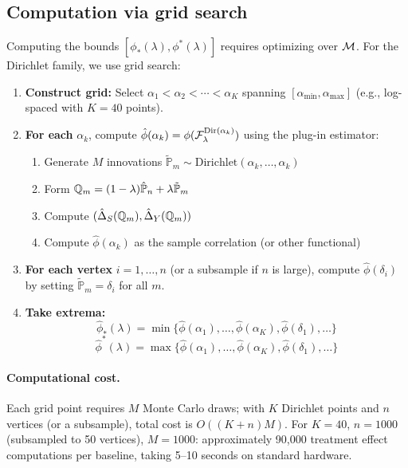 \documentclass{article}
\newcommand{\PP}{\mathbb{P}}
\begin{document}
\subsection{Computation via grid search}

Computing the bounds $[\phi_*(\lambda), \phi^*(\lambda)]$ requires optimizing over $\mathcal{M}$. For the Dirichlet family, we use grid search:

\begin{enumerate}
    \item \textbf{Construct grid:} Select $\alpha_1 < \alpha_2 < \cdots < \alpha_K$ spanning $[\alpha_{\min}, \alpha_{\max}]$ (e.g., log-spaced with $K = 40$ points).

    \item \textbf{For each} $\alpha_k$, compute $\hat{\phi}(\alpha_k) = \phi(\mathcal{F}_\lambda^{\text{Dir}(\alpha_k)})$ using the plug-in estimator:
          \begin{enumerate}
              \item Generate $M$ innovations $\tilde{\PP}_m \sim \text{Dirichlet}(\alpha_k, \ldots, \alpha_k)$
              \item Form $\Q_m = (1-\lambda)\hat{\PP}_n + \lambda\tilde{\PP}_m$
              \item Compute $(\hat{\Delta}_S(\mathbb{Q}_m), \hat{\Delta}_Y(\mathbb{Q}_m))$
              \item Compute $\hat{\phi}(\alpha_k)$ as the sample correlation (or other functional)
          \end{enumerate}

    \item \textbf{For each vertex} $i = 1, \ldots, n$ (or a subsample if $n$ is large), compute $\hat{\phi}(\delta_i)$ by setting $\tilde{\PP}_m = \delta_i$ for all $m$.

    \item \textbf{Take extrema:}
          \[
              \hat{\phi}_*(\lambda) = \min\{\hat{\phi}(\alpha_1), \ldots, \hat{\phi}(\alpha_K), \hat{\phi}(\delta_1), \ldots\}
          \]
          \[
              \hat{\phi}^*(\lambda) = \max\{\hat{\phi}(\alpha_1), \ldots, \hat{\phi}(\alpha_K), \hat{\phi}(\delta_1), \ldots\}
          \]
\end{enumerate}

\paragraph{Computational cost.}
Each grid point requires $M$ Monte Carlo draws; with $K$ Dirichlet points and $n$ vertices (or a subsample), total cost is $O((K + n)M)$. For $K = 40$, $n = 1000$ (subsampled to 50 vertices), $M = 1000$: approximately 90,000 treatment effect computations per baseline, taking 5--10 seconds on standard hardware.
\end{document}
